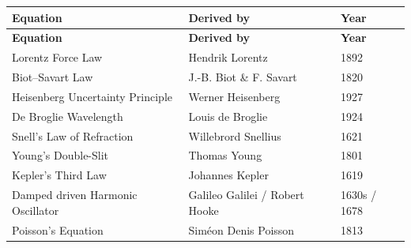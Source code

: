 \documentclass[11pt,openright]{book}
\begin{document}
\begin{longtable}{p{6cm}p{6cm}p{2.5cm}}
\textbf{Equation} & \textbf{Derived by} & \textbf{Year} \\
\hline
\endfirsthead
\textbf{Equation} & \textbf{Derived by} & \textbf{Year} \\
\hline
\endhead
Lorentz Force Law & Hendrik Lorentz & 1892 \\
Biot--Savart Law & J.-B. Biot \& F. Savart & 1820 \\
Heisenberg Uncertainty Principle & Werner Heisenberg & 1927 \\
De Broglie Wavelength & Louis de Broglie & 1924 \\
Snell's Law of Refraction & Willebrord Snellius & 1621 \\
Young's Double-Slit & Thomas Young & 1801 \\
Kepler's Third Law & Johannes Kepler & 1619 \\
Damped driven Harmonic Oscillator & Galileo Galilei / Robert Hooke & 1630s / 1678 \\
Poisson's Equation & Sim\'{e}on Denis Poisson & 1813 \\


\end{longtable}
\end{document}
